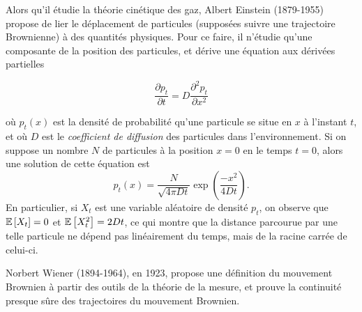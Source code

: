 Alors qu'il étudie la théorie cinétique des gaz, Albert Einstein
(1879-1955) propose de lier le déplacement de particules (supposées
suivre une trajectoire Brownienne) à des quantités physiques. Pour ce
faire, il n'étudie qu'une composante de la position des particules, et
dérive une équation aux dérivées partielles

\begin{equation*}
  \frac{\partial p_t}{\partial t} = D \frac{\partial^2 p_t}{\partial x^2}
\end{equation*}

où $p_t(x)$ est la densité de probabilité qu'une particule se situe en
$x$ à l'instant $t$, et où $D$ est le \emph{coefficient de diffusion}
des particules dans l'environnement. Si on suppose un nombre $N$ de
particules à la position $x=0$ en le temps $t=0$, alors une solution
de cette équation est
\begin{equation*}
  p_t(x) = \frac{N}{\sqrt{4\pi Dt}}\exp(\frac{-x^2}{4Dt}).
\end{equation*}
En particulier, si $X_t$ est une variable aléatoire de densité $p_t$,
on observe que $\mathbb{E}\left[X_t\right] = 0$ et $\mathbb{E}\left[X_t^2\right] = 2Dt$, ce qui montre
que la distance parcourue par une telle particule ne dépend pas
linéairement du temps, mais de la racine carrée de celui-ci.

Norbert Wiener (1894-1964), en 1923, propose une définition du
mouvement Brownien à partir des outils de la théorie de la mesure, et
prouve la continuité presque sûre des trajectoires du mouvement
Brownien.